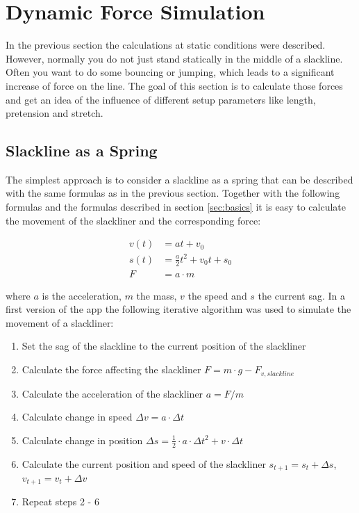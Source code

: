 
\chapter{Dynamic Force Simulation}

In the previous section the calculations at static conditions were described. However, normally you do not just stand statically in the middle of a slackline. Often you want to do some bouncing or jumping, which leads to a significant increase of force on the line. The goal of this section is to calculate those forces and get an idea of the influence of different setup parameters like length, pretension and stretch.

\section{Slackline as a Spring}

The simplest approach is to consider a slackline as a spring that can be described with the same formulas as in the previous section. Together with the following formulas and the formulas described in section \ref{sec:basics} it is easy to calculate the movement of the slackliner and the corresponding force:

\begin{align}
v(t) &= at+v_0 \\
s(t) &= \frac{a}{2}t^2 + v_0 t + s_0 \\
F &= a\cdot m
\end{align}

where $a$ is the acceleration, $m$ the mass, $v$ the speed and $s$ the current sag. In a first version of the app the following iterative algorithm was used to simulate the movement of a slackliner: 

\begin{enumerate}
	\item Set the sag of the slackline to the current position of  the slackliner
	\item Calculate the force affecting the slackliner $F = m\cdot g - F_{v,slackline}$
	\item Calculate the acceleration of the slackliner $a = F / m$
	\item Calculate change in speed $\Delta v = a\cdot\Delta t$
	\item Calculate change in position $\Delta s = \frac{1}{2}\cdot a\cdot\Delta t^2 + v\cdot\Delta t$
	\item Calculate the current position and speed of the slackliner $s_{t+1} = s_{t} + \Delta s$, $v_{t+1} = v_{t} + \Delta v$
	\item Repeat steps 2 - 6
\end{enumerate}

